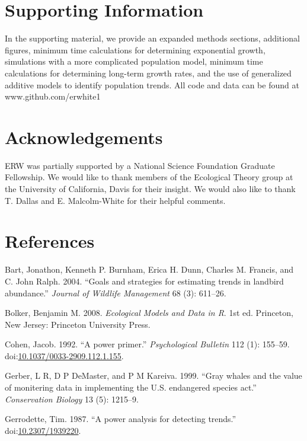 \documentclass[12pt,]{article}
\begin{document}
\section{Supporting Information}\label{supporting-information}

In the supporting material, we provide an expanded methods sections,
additional figures, minimum time calculations for determining
exponential growth, simulations with a more complicated population
model, minimum time calculations for determining long-term growth rates,
and the use of generalized additive models to identify population
trends. All code and data can be found at www.github.com/erwhite1

\section{Acknowledgements}\label{acknowledgements}

ERW was partially supported by a National Science Foundation Graduate
Fellowship. We would like to thank members of the Ecological Theory
group at the University of California, Davis for their insight. We would
also like to thank T. Dallas and E. Malcolm-White for their helpful
comments.

\section{References}\label{references}

\hypertarget{refs}{}
\hypertarget{ref-Bart2004}{}
Bart, Jonathon, Kenneth P. Burnham, Erica H. Dunn, Charles M. Francis,
and C. John Ralph. 2004. ``Goals and strategies for estimating trends in
landbird abundance.'' \emph{Journal of Wildlife Management} 68 (3):
611--26.

\hypertarget{ref-Bolker2008}{}
Bolker, Benjamin M. 2008. \emph{Ecological Models and Data in R}. 1st
ed. Princeton, New Jersey: Princeton University Press.

\hypertarget{ref-Cohen1992}{}
Cohen, Jacob. 1992. ``A power primer.'' \emph{Psychological Bulletin}
112 (1): 155--59.
doi:\href{https://doi.org/10.1037/0033-2909.112.1.155}{10.1037/0033-2909.112.1.155}.

\hypertarget{ref-Gerber1999}{}
Gerber, L R, D P DeMaster, and P M Kareiva. 1999. ``Gray whales and the
value of monitering data in implementing the U.S. endangered species
act.'' \emph{Conservation Biology} 13 (5): 1215--9.

\hypertarget{ref-Gerrodette1987}{}
Gerrodette, Tim. 1987. ``A power analysis for detecting trends.''
doi:\href{https://doi.org/10.2307/1939220}{10.2307/1939220}.
\end{document}
